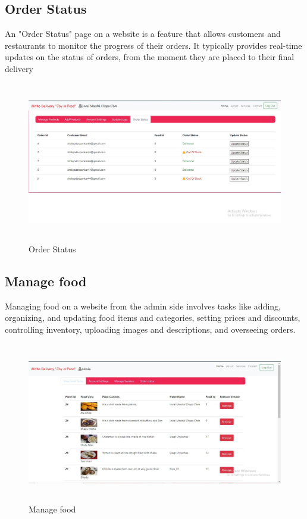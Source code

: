 \subsection{Order Status}
An "Order Status" page on a website is a feature that allows customers and restaurants to monitor the progress of their orders. It typically provides real-time updates on the status of orders, from the moment they are placed to their final delivery
\begin{figure}[h]
    \centering
    \includegraphics[height=7cm]{img/Graphics/hotel order status.JPG}
    \caption{Order Status}
\end{figure}

\subsection{Manage food}
Managing food on a website from the admin side involves tasks like adding, organizing, and updating food items and categories, setting prices and discounts, controlling inventory, uploading images and descriptions, and overseeing orders.
\begin{figure}[h]
    \centering
    \includegraphics[height=7cm]{img/Graphics/admine manage food.JPG}
    \caption{Manage food}
\end{figure}

